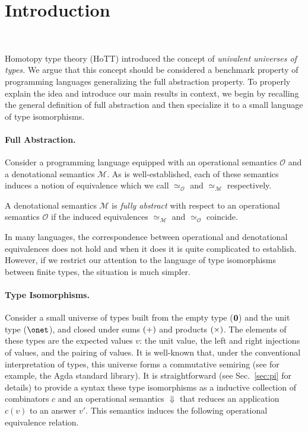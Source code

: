 \section{Introduction}~\label{sec:introduction}

Homotopy type theory (HoTT) introduced the concept of \emph{univalent universes
  of types.} We argue that this concept should be considered a benchmark
property of programming languages generalizing the full abstraction property. To
properly explain the idea and introduce our main results in context, we begin by
recalling the general definition of full abstraction and then specialize it to a small
language of type isomorphisms.

\paragraph*{Full Abstraction.} Consider a programming language equipped with an
operational semantics $\mathcal{O}$ and a denotational semantics
$\mathcal{M}$. As is well-established, each of these semantics induces a notion
of equivalence which we call $\simeq_{\mathcal{O}}$ and $\simeq_{\mathcal{M}}$
respectively.

\begin{definition} A denotational semantics $\mathcal{M}$ is
  \emph{fully abstract} with respect to an operational semantics $\mathcal{O}$
  if the induced equivalences $\simeq_{\mathcal{M}}$ and $\simeq_{\mathcal{O}}$
  coincide.
\end{definition}

In many languages, the correspondence between operational and denotational
equivalences does not hold and when it does it is quite complicated to
establish. However, if we restrict our attention to the language of type
isomorphisms between finite types, the situation is much simpler.

\paragraph*{Type Isomorphisms.} Consider a small universe of types built from
the empty type (${\mathbf{0}}$) and the unit type ($\onet$), and closed under sums
$(\mathbin{\mathsf{+}})$ and products $(\mathbin{\mathsf{\times}})$. The elements of these types are the expected
values $v$: the unit value, the left and right injections of values, and the
pairing of values. It is well-known that, under the conventional interpretation
of types, this universe forms a commutative semiring (see for example, the Agda
standard library). It is straightforward (see Sec.~\ref{sec:pi} for details) to
provide a syntax these type isomorphisms as a inductive collection of
combinators $c$ and an operational semantics $\Downarrow$ that reduces an
application $c(v)$ to an answer $v'$. This semantics induces the following
operational equivalence relation.

